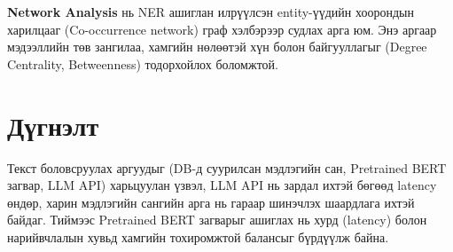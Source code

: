 \textbf{Network Analysis} нь NER ашиглан илрүүлсэн entity-үүдийн хоорондын харилцааг (Co-occurrence network) граф хэлбэрээр судлах арга юм. Энэ аргаар мэдээллийн төв зангилаа, хамгийн нөлөөтэй хүн болон байгууллагыг (Degree Centrality, Betweenness) тодорхойлох боломжтой.

\section{Дүгнэлт}
Текст боловсруулах аргуудыг (DB-д суурилсан мэдлэгийн сан, Pretrained BERT загвар, LLM API) харьцуулан үзвэл, LLM API нь зардал ихтэй бөгөөд latency өндөр, харин мэдлэгийн сангийн арга нь гараар шинэчлэх шаардлага ихтэй байдаг. Тиймээс Pretrained BERT загварыг ашиглах нь хурд (latency) болон нарийвчлалын хувьд хамгийн тохиромжтой балансыг бүрдүүлж байна.
